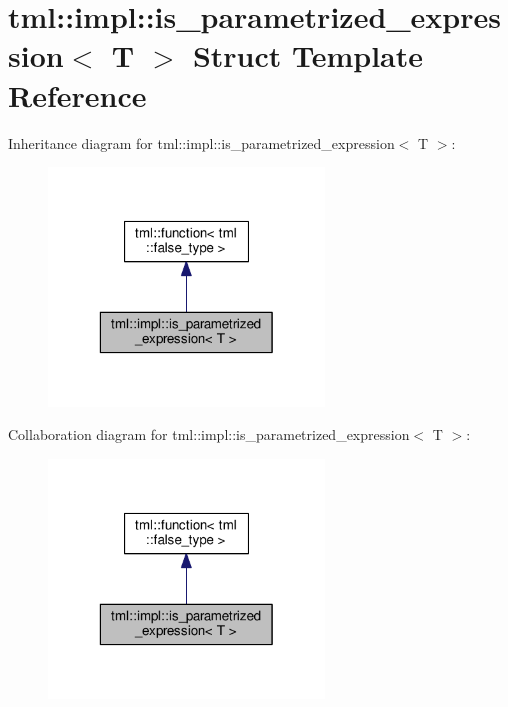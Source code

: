 \hypertarget{structtml_1_1impl_1_1is__parametrized__expression}{\section{tml\+:\+:impl\+:\+:is\+\_\+parametrized\+\_\+expression$<$ T $>$ Struct Template Reference}
\label{structtml_1_1impl_1_1is__parametrized__expression}
}


Inheritance diagram for tml\+:\+:impl\+:\+:is\+\_\+parametrized\+\_\+expression$<$ T $>$\+:
\nopagebreak
\begin{figure}[H]
\begin{center}
\leavevmode
\includegraphics[width=208pt]{structtml_1_1impl_1_1is__parametrized__expression__inherit__graph}
\end{center}
\end{figure}


Collaboration diagram for tml\+:\+:impl\+:\+:is\+\_\+parametrized\+\_\+expression$<$ T $>$\+:
\nopagebreak
\begin{figure}[H]
\begin{center}
\leavevmode
\includegraphics[width=208pt]{structtml_1_1impl_1_1is__parametrized__expression__coll__graph}
\end{center}
\end{figure}
